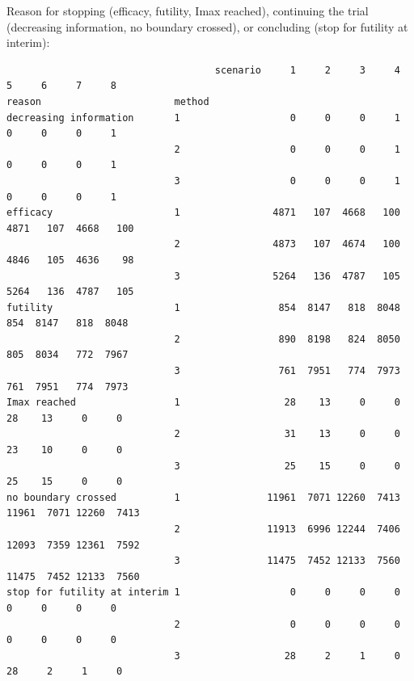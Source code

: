 \documentclass[12pt]{article}
\begin{document}
Reason for stopping (efficacy, futility, Imax reached), continuing the
trial (decreasing information, no boundary crossed), or concluding
(stop for futility at interim):
\begin{verbatim}
                                    scenario     1     2     3     4     5     6     7     8
reason                       method                                                         
decreasing information       1                   0     0     0     1     0     0     0     1
                             2                   0     0     0     1     0     0     0     1
                             3                   0     0     0     1     0     0     0     1
efficacy                     1                4871   107  4668   100  4871   107  4668   100
                             2                4873   107  4674   100  4846   105  4636    98
                             3                5264   136  4787   105  5264   136  4787   105
futility                     1                 854  8147   818  8048   854  8147   818  8048
                             2                 890  8198   824  8050   805  8034   772  7967
                             3                 761  7951   774  7973   761  7951   774  7973
Imax reached                 1                  28    13     0     0    28    13     0     0
                             2                  31    13     0     0    23    10     0     0
                             3                  25    15     0     0    25    15     0     0
no boundary crossed          1               11961  7071 12260  7413 11961  7071 12260  7413
                             2               11913  6996 12244  7406 12093  7359 12361  7592
                             3               11475  7452 12133  7560 11475  7452 12133  7560
stop for futility at interim 1                   0     0     0     0     0     0     0     0
                             2                   0     0     0     0     0     0     0     0
                             3                  28     2     1     0    28     2     1     0
\end{verbatim}
\end{document}
